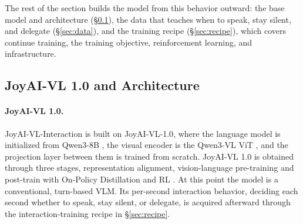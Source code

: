 


The rest of the section builds the model from this behavior outward: the base model and architecture (\S\ref{sec:arch}), the data that teaches when to speak, stay silent, and delegate (\S\ref{sec:data}), and the training recipe (\S\ref{sec:recipe}), which covers continue training, the training objective, reinforcement learning, and infrastructure.




\subsection{JoyAI-VL 1.0 and Architecture}
\label{sec:arch}



\paragraph{\textbf{JoyAI-VL 1.0.}}
JoyAI-VL-Interaction is built on JoyAI-VL-1.0, %
where the language model is initialized from Qwen3-8B \cite{yang2025qwen3technicalreport}, the visual encoder is the Qwen3-VL ViT \cite{bai2025qwen3vltechnicalreport}, and the projection layer between them is trained from scratch. JoyAI-VL 1.0 is obtained through three stages, representation alignment, vision-language pre-training and post-train with On-Policy Distillation \cite{lu2025onpolicydistillation} and RL \cite{liu2026gdpogrouprewarddecouplednormalization,shao2024deepseekmathpushinglimitsmathematical}. At this point the model is a conventional, turn-based VLM. Its per-second interaction behavior, deciding each second whether to speak, stay silent, or delegate, is acquired afterward through the interaction-training recipe in \S\ref{sec:recipe}.



